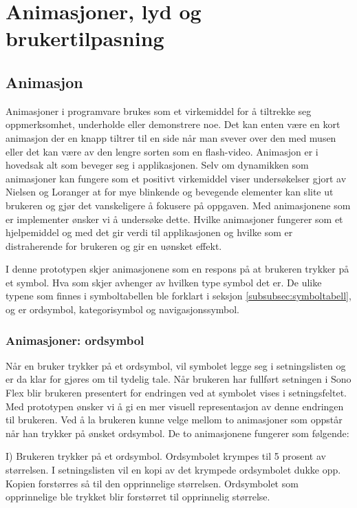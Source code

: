 \chapter{Animasjoner, lyd og brukertilpasning}
 
\section{Animasjon} 
 
 
Animasjoner i programvare brukes som et virkemiddel for å tiltrekke seg oppmerksomhet, underholde eller demonstrere noe. Det kan enten være en kort animasjon der en knapp tiltrer til en side når man svever over den med musen eller det kan være av den lengre sorten som en flash-video.  Animasjon er i hovedsak alt som beveger seg i applikasjonen. Selv om dynamikken som animasjoner kan fungere som et positivt virkemiddel viser undersøkelser gjort av Nielsen og Loranger \cite{NielsenBok}  at for mye blinkende og bevegende elementer kan slite ut brukeren og gjør det vanskeligere å fokusere på oppgaven. Med animasjonene som er implementer ønsker vi å undersøke dette. Hvilke animasjoner fungerer som et hjelpemiddel og med det gir verdi til applikasjonen og hvilke som er distraherende for brukeren og gir en uønsket effekt. 
 
 
I denne prototypen skjer animasjonene som en respons på at brukeren trykker på et symbol. Hva som skjer avhenger av hvilken type symbol det er. De ulike typene som finnes i symboltabellen ble forklart i seksjon \ref{subsubsec:symboltabell}, og er ordsymbol, kategorisymbol og navigasjonssymbol. 
 
 
 
 
\subsection{Animasjoner: ordsymbol} 
 
 
Når en bruker trykker på et ordsymbol, vil symbolet legge seg i setningslisten og er da klar for gjøres om til tydelig tale. Når brukeren har fullført setningen i Sono Flex blir brukeren presentert for endringen ved at symbolet vises i setningsfeltet. Med prototypen ønsker vi  å gi en mer visuell representasjon av denne endringen til brukeren. Ved å la brukeren kunne velge mellom to animasjoner som oppstår når han trykker på ønsket ordsymbol. De to animasjonene fungerer som følgende: 
 

I) Brukeren trykker på et ordsymbol. 
   Ordsymbolet krympes til 5 prosent av størrelsen. 
   I setningslisten vil en kopi av det krympede ordsymbolet dukke opp. 
   Kopien forstørres så til den opprinnelige størrelsen. 
   Ordsymbolet som opprinnelige ble trykket blir forstørret til opprinnelig størrelse. 
 

